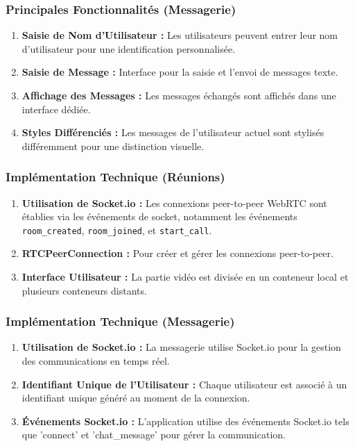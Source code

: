 \documentclass[12pt, a4paper, oneside]{article}
\begin{document}
\subsubsection{Principales Fonctionnalités (Messagerie)}
\begin{enumerate}
    \item \textbf{Saisie de Nom d'Utilisateur :} Les utilisateurs peuvent entrer leur nom d'utilisateur pour une identification personnalisée.
    \item \textbf{Saisie de Message :} Interface pour la saisie et l'envoi de messages texte.
    \item \textbf{Affichage des Messages :} Les messages échangés sont affichés dans une interface dédiée.
    \item \textbf{Styles Différenciés :} Les messages de l'utilisateur actuel sont stylisés différemment pour une distinction visuelle.
\end{enumerate}

\subsubsection{Implémentation Technique (Réunions)}
\begin{enumerate}
    \item \textbf{Utilisation de Socket.io :} Les connexions peer-to-peer WebRTC sont établies via les événements de socket, notamment les événements \texttt{room\_created}, \texttt{room\_joined}, et \texttt{start\_call}.
    \item \textbf{RTCPeerConnection :} Pour créer et gérer les connexions peer-to-peer.
    \item \textbf{Interface Utilisateur :} La partie vidéo est divisée en un conteneur local et plusieurs conteneurs distants.
\end{enumerate}

\subsubsection{Implémentation Technique (Messagerie)}
\begin{enumerate}
    \item \textbf{Utilisation de Socket.io :} La messagerie utilise Socket.io pour la gestion des communications en temps réel.
    \item \textbf{Identifiant Unique de l'Utilisateur :} Chaque utilisateur est associé à un identifiant unique généré au moment de la connexion.
    \item \textbf{Événements Socket.io :} L'application utilise des événements Socket.io tels que 'connect' et 'chat\_message' pour gérer la communication.
\end{enumerate}
\end{document}
